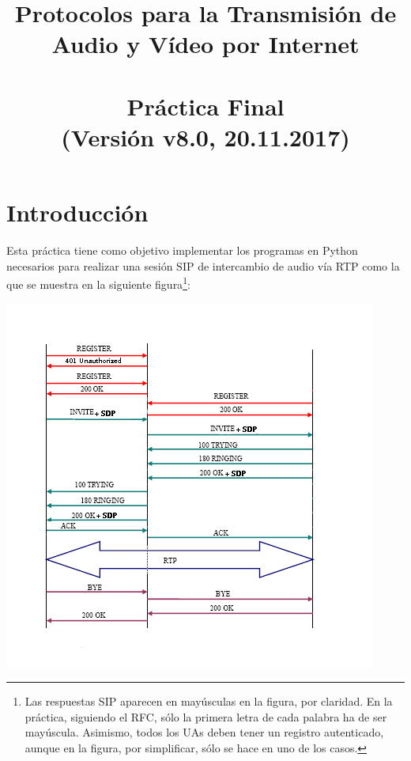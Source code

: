 \documentclass[a4paper,11pt]{article}
\begin{document}
\title{Protocolos para la Transmisión de Audio y Vídeo por Internet\\ 
\ \\ 
Práctica Final \\
(Versión v8.0, 20.11.2017) %
}

\maketitle
\thispagestyle{empty}
\tableofcontents
\newpage


\section{Introducción}

Esta práctica tiene como objetivo implementar los programas en Python 
necesarios para realizar una sesión SIP de intercambio de audio vía RTP
como la que se muestra en la siguiente figura\footnote{Las respuestas SIP
aparecen en mayúsculas en la figura, por claridad. En la práctica, siguiendo
el RFC, sólo la primera letra de cada palabra ha de ser mayúscula. Asimismo, todos los UAs deben tener un registro autenticado, aunque en la figura, por simplificar, sólo se hace en uno de los casos.}:

\begin{center}
\includegraphics{figs/complete-sip-session-auth.png}
\end{center}
\end{document}
